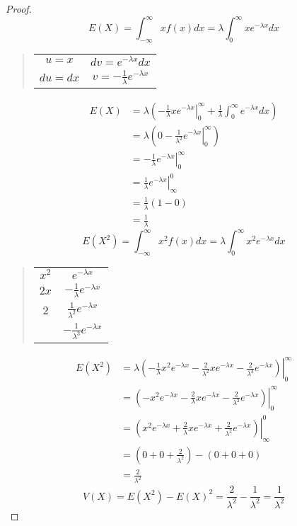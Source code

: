 \documentclass[letterpaper,12pt,fleqn]{article}
\renewcommand{\l}{\lambda}
\begin{document}
\begin{proof}
  \[E(X)=\int_{-\infty}^{\infty}xf(x)dx=\l\int_0^{\infty}xe^{-\l x}dx\]
  \begin{quote}
    \begin{tabular}{cc}
      \(u=x\) & \(dv=e^{-\l x}dx\) \\
      \(du=dx\) & \(v=-\frac{1}{\l}e^{-\l x}\)
    \end{tabular}
  \end{quote}
  \begin{align*}
    E(X) &= \l\left(\left.-\frac{1}{\l}xe^{-\l x}\right|_0^{\infty}+\frac{1}{\l}\int_0^{\infty}e^{-\l x}dx\right) \\
    &= \l\left(0-\left.\frac{1}{\l^2}e^{-\l x}\right|_0^{\infty}\right) \\
    &= -\left.\frac{1}{\l}e^{-\l x}\right|_0^{\infty} \\
    &= \left.\frac{1}{\l}e^{-\l x}\right|_{\infty}^0 \\
    &= \frac{1}{\l}(1-0) \\
    &= \frac{1}{\l}
  \end{align*}
  \[E(X^2)=\int_{-\infty}^{\infty}x^2f(x)dx=\l\int_0^{\infty}x^2e^{-\l x}dx\]
  \begin{quote}
    \begin{tabular}{cc}
      \(x^2\) & \(e^{-\l x}\) \\
      \(2x\) & \(-\frac{1}{\l}e^{-\l x}\) \\
      \(2\) & \(\frac{1}{\l^2}e^{-\l x}\) \\
      & \(-\frac{1}{\l^3}e^{-\l x}\) \\
    \end{tabular}
  \end{quote}
  \begin{align*}
    E(X^2) &= \left.\l\left(-\frac{1}{\l}x^2e^{-\l x}-\frac{2}{\l^2}xe^{-\l x}-\frac{2}{\l^3}e^{-\l x}\right)
    \right|_0^{\infty} \\
    &= \left.\left(-x^2e^{-\l x}-\frac{2}{\l}xe^{-\l x}-\frac{2}{\l^2}e^{-\l x}\right)\right|_0^{\infty} \\
    &= \left.\left(x^2e^{-\l x}+\frac{2}{\l}xe^{-\l x}+\frac{2}{\l^2}e^{-\l x}\right)\right|_{\infty}^0 \\
    &= \left(0+0+\frac{2}{\l^2}\right)-(0+0+0) \\
    &= \frac{2}{\l^2}
  \end{align*}
  \[V(X)=E(X^2)-E(X)^2=\frac{2}{\l^2}-\frac{1}{\l^2}=\frac{1}{\l^2}\]
\end{proof}
\end{document}

